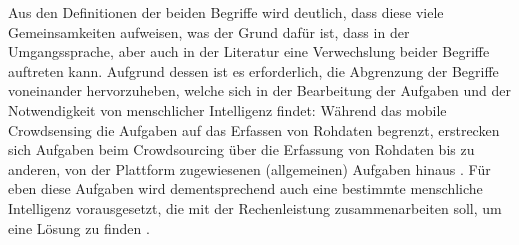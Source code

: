 Aus den Definitionen der beiden Begriffe wird deutlich, dass diese viele Gemeinsamkeiten aufweisen, was der Grund dafür ist, dass in der Umgangssprache, aber auch in der Literatur eine Verwechslung beider Begriffe auftreten kann. Aufgrund dessen ist es erforderlich, die Abgrenzung der Begriffe voneinander hervorzuheben, welche sich in der Bearbeitung der Aufgaben und der Notwendigkeit von menschlicher Intelligenz findet: Während das mobile Crowdsensing die Aufgaben auf das Erfassen von Rohdaten begrenzt, erstrecken sich Aufgaben beim Crowdsourcing über die Erfassung von Rohdaten bis zu anderen, von der Plattform zugewiesenen (allgemeinen) Aufgaben hinaus \cite{Ray2022}. Für eben diese Aufgaben wird dementsprechend auch eine bestimmte menschliche Intelligenz vorausgesetzt, die mit der Rechenleistung zusammenarbeiten soll, um eine Lösung zu finden \cite{Ray2022}.

